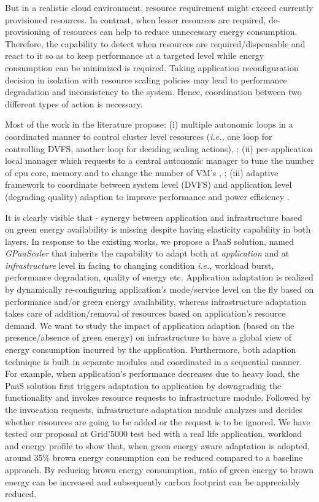 But in a realistic cloud environment, resource requirement might exceed currently provisioned resources. In contrast, when lesser resources are required, de-provisioning of resources can help to reduce unnecessary energy consumption. Therefore, the capability to detect when resources are required/dispensable and react to it so as to keep performance at a targeted level while energy consumption can be minimized is required. Taking application reconfiguration decision in isolation with resource scaling policies may lead to performance degradation and inconsistency to the system. Hence, coordination between two different types of action is necessary.

Most of the work in the literature propose: (i) multiple autonomic loops in a coordinated manner to control cluster level resources (\emph{i.e.,} one loop for controlling DVFS, another loop for deciding scaling actions)\cite{server-cluster}, \cite{shi}; (ii) per-application local manager which requests to a central autonomic manager to tune the number of cpu core, memory and to change the number of VM's \cite{morin1}, \cite{morin2}; (iii) adaptive framework to coordinate between system level (DVFS) and application level (degrading quality) adaption to improve performance and power efficiency \cite{adaptcap}.

It is clearly visible that - synergy between application and infrastructure based on green energy availability is missing despite having elasticity capability in both layers. In response to the existing works, we propose a PaaS solution, named \emph{GPaaScaler} that inherits the capability to adapt both at \emph{application} and at \emph{infrastructure} level in facing to changing condition \emph{i.e.,} workload burst, performance degradation, quality of energy etc. Application adaptation is realized by dynamically re-configuring application's mode/service level on the fly based on performance and/or green energy availability, whereas infrastructure adaptation takes care of addition/removal of resources based on application's resource demand. We want to study the impact of application adaption (based on the presence/absence of green energy) on infrastructure to have a global view of energy consumption incurred by the application.
Furthermore, both adaption technique is built in separate modules and coordinated in a sequential manner. For example, when application's performance decreases due to heavy load, the PaaS solution first triggers adaptation to application by downgrading the functionality and invokes resource requests to infrastructure module. Followed by the invocation requests, infrastructure adaptation module analyzes and decides whether resources are going to be added or the request is to be ignored. We have tested our proposal at Grid'5000 test bed with a real life application, workload and energy profile to show that, when green energy aware adaptation is adopted, around 35\% brown energy consumption can be reduced compared to a baseline approach. By reducing brown energy consumption, ratio of green energy to brown energy can be increased and subsequently carbon footprint can be appreciably reduced.

